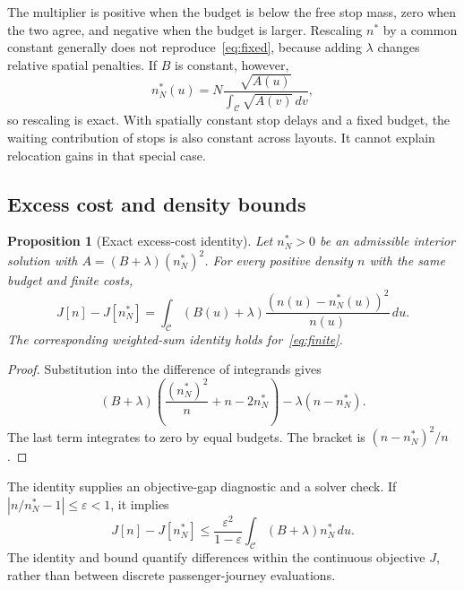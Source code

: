 \documentclass[11pt]{article}
\newtheorem{proposition}[theorem]{Proposition}
\theoremstyle{remark}\newtheorem{remark}[theorem]{Remark}
\newcommand{\C}{\mathcal C}
\begin{document}
The multiplier is positive when the budget is below the free stop mass, zero when the two agree, and negative when the budget is larger. Rescaling $n^*$ by a common constant generally does not reproduce~\eqref{eq:fixed}, because adding $\lambda$ changes relative spatial penalties. If $B$ is constant, however,
\begin{equation}
n_N^*(u)=N\frac{\sqrt{A(u)}}{\int_\C\sqrt{A(v)}\,dv},
\end{equation}
so rescaling is exact. With spatially constant stop delays and a fixed budget, the waiting contribution of stops is also constant across layouts. It cannot explain relocation gains in that special case.

\subsection{Excess cost and density bounds}
\begin{proposition}[Exact excess-cost identity]\label{prop:gap}
Let $n_N^*>0$ be an admissible interior solution with $A=(B+\lambda)(n_N^*)^2$. For every positive density $n$ with the same budget and finite costs,
\begin{equation}
J[n]-J[n_N^*]=\int_\C(B(u)+\lambda)\frac{(n(u)-n_N^*(u))^2}{n(u)}\,du.\label{eq:gap}
\end{equation}
The corresponding weighted-sum identity holds for~\eqref{eq:finite}.
\end{proposition}
\begin{proof}
Substitution into the difference of integrands gives
\begin{equation*}
(B+\lambda)\left(\frac{(n_N^*)^2}{n}+n-2n_N^*\right)-\lambda(n-n_N^*).
\end{equation*}
The last term integrates to zero by equal budgets. The bracket is $(n-n_N^*)^2/n$.
\end{proof}
The identity supplies an objective-gap diagnostic and a solver check. If $|n/n_N^*-1|\leq\varepsilon<1$, it implies
\begin{equation}
J[n]-J[n_N^*]\leq\frac{\varepsilon^2}{1-\varepsilon}\int_\C(B+\lambda)n_N^*\,du.
\end{equation}
The identity and bound quantify differences within the continuous objective $J$, rather than between discrete passenger-journey evaluations.
\end{document}
